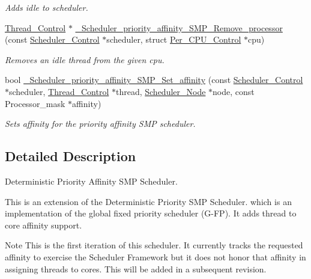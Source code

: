 \begin{DoxyCompactItemize}
\begin{DoxyCompactList}\small\item\em Adds {\itshape idle} to {\itshape scheduler}. \end{DoxyCompactList}\item 
\mbox{\hyperlink{struct__Thread__Control}{Thread\+\_\+\+Control}} $\ast$ \mbox{\hyperlink{group__RTEMSScoreSchedulerPriorityAffinitySMP_ga1db5f76b6724cc01c34e0599225fba24}{\+\_\+\+Scheduler\+\_\+priority\+\_\+affinity\+\_\+\+S\+M\+P\+\_\+\+Remove\+\_\+processor}} (const \mbox{\hyperlink{struct__Scheduler__Control}{Scheduler\+\_\+\+Control}} $\ast$scheduler, struct \mbox{\hyperlink{structPer__CPU__Control}{Per\+\_\+\+C\+P\+U\+\_\+\+Control}} $\ast$cpu)
\begin{DoxyCompactList}\small\item\em Removes an idle thread from the given cpu. \end{DoxyCompactList}\item 
bool \mbox{\hyperlink{group__RTEMSScoreSchedulerPriorityAffinitySMP_gab61693a5ce8950f216338a502a68b7ac}{\+\_\+\+Scheduler\+\_\+priority\+\_\+affinity\+\_\+\+S\+M\+P\+\_\+\+Set\+\_\+affinity}} (const \mbox{\hyperlink{struct__Scheduler__Control}{Scheduler\+\_\+\+Control}} $\ast$scheduler, \mbox{\hyperlink{struct__Thread__Control}{Thread\+\_\+\+Control}} $\ast$thread, \mbox{\hyperlink{structScheduler__Node}{Scheduler\+\_\+\+Node}} $\ast$node, const Processor\+\_\+mask $\ast$affinity)
\begin{DoxyCompactList}\small\item\em Sets affinity for the priority affinity S\+MP scheduler. \end{DoxyCompactList}\end{DoxyCompactItemize}


\subsection{Detailed Description}
Deterministic Priority Affinity S\+MP Scheduler. 

This is an extension of the Deterministic Priority S\+MP Scheduler. which is an implementation of the global fixed priority scheduler (G-\/\+FP). It adds thread to core affinity support.

\begin{DoxyNote}{Note}
This is the first iteration of this scheduler. It currently tracks the requested affinity to exercise the Scheduler Framework but it does not honor that affinity in assigning threads to cores. This will be added in a subsequent revision. 
\end{DoxyNote}


